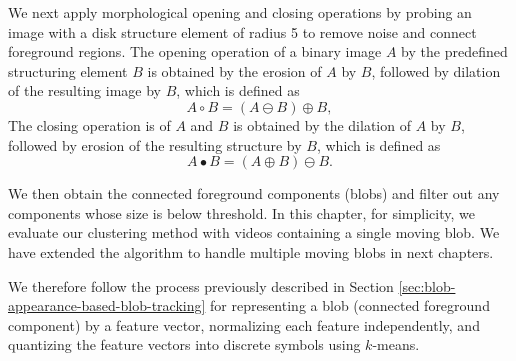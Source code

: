 We next apply morphological opening and closing operations by probing 
an image with a disk structure element of radius 5 to remove
noise and connect foreground regions. The opening operation of a binary 
image $A$ by the predefined structuring element $B$ is obtained by the 
erosion of $A$ by $B$, followed by dilation of the 
resulting image by $B$, which is defined as 
\begin{equation*}
    A \circ B = (A \ominus B) \oplus B, 
\end{equation*}
The closing operation is of $A$ and $B$ is obtained by the dilation of 
$A$ by $B$, followed by erosion of the resulting structure by $B$, 
which is defined as 
\begin{equation*}
    A \bullet B = (A \oplus B) \ominus B.
\end{equation*}

We then obtain the connected
foreground components (blobs) and filter out any components whose size
is below threshold. In this chapter, for simplicity, we evaluate our
clustering method with videos containing a single moving blob. We have 
extended the algorithm to handle multiple moving blobs in next chapters.

We therefore follow the process previously described in
Section \ref{sec:blob-appearance-based-blob-tracking} for representing
a blob (connected foreground component) by a feature vector,
normalizing each feature independently, and quantizing the feature
vectors into discrete symbols using $k$-means.



